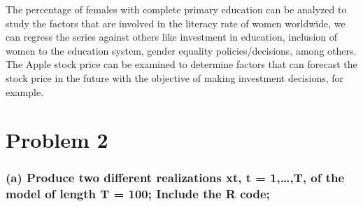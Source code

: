 \documentclass[
]{article}
\begin{document}
The percentage of females with complete primary education can be
analyzed to study the factors that are involved in the literacy rate of
women worldwide, we can regress the series against others like
investment in education, inclusion of women to the education system,
gender equality policies/decisions, among others. The Apple stock price
can be examined to determine factors that can forecast the stock price
in the future with the objective of making investment decisions, for
example.

\hypertarget{problem-2}{%
\section{Problem 2}\label{problem-2}}

\hypertarget{a-produce-two-different-realizations-xt-t-1t-of-the-model-of-length-t-100-include-the-r-code}{%
\subsubsection{(a) Produce two different realizations xt, t =
1,\ldots,T, of the model of length T = 100; Include the R
code;}\label{a-produce-two-different-realizations-xt-t-1t-of-the-model-of-length-t-100-include-the-r-code}}
\end{document}
